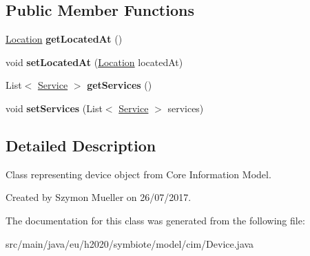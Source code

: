 \subsection*{Public Member Functions}
\begin{DoxyCompactItemize}
\item 
\mbox{\label{classeu_1_1h2020_1_1symbiote_1_1model_1_1cim_1_1Device_a12ab98623fe63514fb72d2d3fb64c8e4}} 
\hyperlink{classeu_1_1h2020_1_1symbiote_1_1model_1_1cim_1_1Location}{Location} {\bfseries get\+Located\+At} ()
\item 
\mbox{\label{classeu_1_1h2020_1_1symbiote_1_1model_1_1cim_1_1Device_acfbd4cab8c7a22cca2179eb12243d9f4}} 
void {\bfseries set\+Located\+At} (\hyperlink{classeu_1_1h2020_1_1symbiote_1_1model_1_1cim_1_1Location}{Location} located\+At)
\item 
\mbox{\label{classeu_1_1h2020_1_1symbiote_1_1model_1_1cim_1_1Device_a37a691936f810a83f0a91367011cf072}} 
List$<$ \hyperlink{classeu_1_1h2020_1_1symbiote_1_1model_1_1cim_1_1Service}{Service} $>$ {\bfseries get\+Services} ()
\item 
\mbox{\label{classeu_1_1h2020_1_1symbiote_1_1model_1_1cim_1_1Device_a33689c30f2e2219158ba5dd0f9858edd}} 
void {\bfseries set\+Services} (List$<$ \hyperlink{classeu_1_1h2020_1_1symbiote_1_1model_1_1cim_1_1Service}{Service} $>$ services)
\end{DoxyCompactItemize}


\subsection{Detailed Description}
Class representing device object from Core Information Model.

Created by Szymon Mueller on 26/07/2017. 

The documentation for this class was generated from the following file\+:\begin{DoxyCompactItemize}
\item 
src/main/java/eu/h2020/symbiote/model/cim/Device.\+java\end{DoxyCompactItemize}

